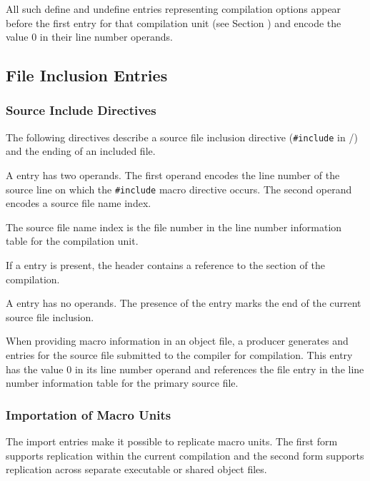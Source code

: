 All such define and undefine entries representing compilation 
options appear before the first \DWMACROstartfile{} 
entry for that compilation unit
(see Section )
and encode the value 0 in their line number operands.

\subsection{File Inclusion Entries}
\label{chap:fileinclusionentries}

\subsubsection{Source Include Directives}
\label{chap:sourceincludedirectives}

The following directives describe a source
file inclusion directive (\texttt{\#include} in
/) and the
ending of an included file.

\begin{enumerate}[1. ]

\itembfnl{\DWMACROstartfileTARG{}}
A \DWMACROstartfileNAME{} entry has two operands. The
first operand encodes the line number of the source line on
which the \texttt{\#include} macro directive occurs. 
The second operand encodes a source file name index. 

The source file name index is the file number in the 
line number information table for the compilation unit.

If a \DWMACROstartfileNAME{} entry is present, the header
contains a reference to the \dotdebugline{} section of 
the compilation.

\itembfnl{\DWMACROendfileTARG{}}
A \DWMACROendfileNAME{} entry has no operands. The presence of
the entry marks the end of the current source file inclusion.

\end{enumerate}

When providing macro information in an object file,
a producer generates \DWMACROstartfile{} and
\DWMACROendfile{} entries for the source file submitted to
the compiler for compilation. This \DWMACROstartfile{} entry
has the value 0 in its line number operand and references
the file entry in the line number information table for the
primary source file.

\subsubsection{Importation of Macro Units}
\label{chap:importationofmacrounits}
The import entries make it possible to replicate macro units.
The first form supports replication within the current compilation
and the second form supports replication across separate 
executable or shared object files.

